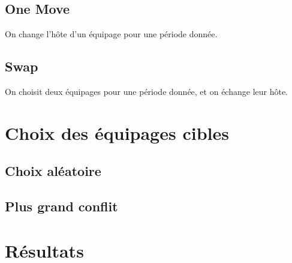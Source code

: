 \documentclass[a4paper,10pt]{report}
\begin{document}
\subsection{One Move}
On change l'hôte d'un équipage pour une période donnée.

\subsection{Swap}
On choisit deux équipages pour une période donnée, et on échange leur hôte.

\section{Choix des équipages cibles}
\subsection{Choix aléatoire}

\subsection{Plus grand conflit}


\pagebreak
\section{Résultats}
\end{document}
